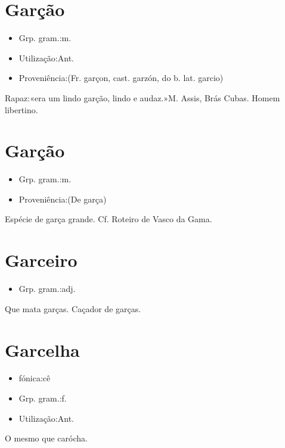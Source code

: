 \section{Garção}
\begin{itemize}
\item {Grp. gram.:m.}
\end{itemize}
\begin{itemize}
\item {Utilização:Ant.}
\end{itemize}
\begin{itemize}
\item {Proveniência:(Fr. \textunderscore garçon\textunderscore , cast. \textunderscore garzón\textunderscore , do b. lat. \textunderscore garcio\textunderscore )}
\end{itemize}
Rapaz:«\textunderscore era um lindo garção, lindo e audaz.\textunderscore »M. Assis, \textunderscore Brás Cubas\textunderscore .
Homem libertino.
\section{Garção}
\begin{itemize}
\item {Grp. gram.:m.}
\end{itemize}
\begin{itemize}
\item {Proveniência:(De \textunderscore garça\textunderscore )}
\end{itemize}
Espécie de garça grande. Cf. \textunderscore Roteiro de Vasco da Gama\textunderscore .
\section{Garceiro}
\begin{itemize}
\item {Grp. gram.:adj.}
\end{itemize}
Que mata garças.
Caçador de garças.
\section{Garcelha}
\begin{itemize}
\item {fónica:cê}
\end{itemize}
\begin{itemize}
\item {Grp. gram.:f.}
\end{itemize}
\begin{itemize}
\item {Utilização:Ant.}
\end{itemize}
O mesmo que \textunderscore carócha\textunderscore .
